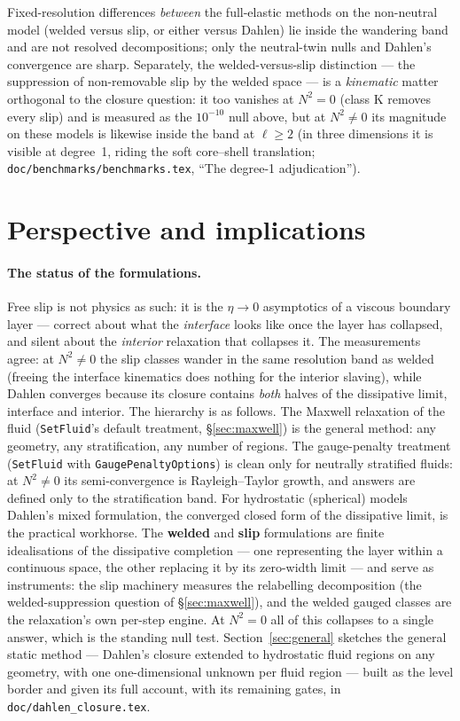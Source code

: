 \documentclass[11pt]{article}
\newcommand{\code}[1]{\texttt{#1}}
\begin{document}
\noindent
Fixed-resolution differences \emph{between} the full-elastic methods
on the non-neutral model (welded versus slip, or either versus
Dahlen) lie inside the wandering band and are not resolved
decompositions; only the neutral-twin nulls and Dahlen's convergence
are sharp. Separately, the welded-versus-slip distinction --- the
suppression of non-removable slip by the welded space --- is a
\emph{kinematic} matter orthogonal to the closure question: it too
vanishes at $N^2 = 0$ (class K removes every slip) and is measured as
the $10^{-10}$ null above, but at $N^2 \neq 0$ its magnitude on these
models is likewise inside the band at $\ell \ge 2$ (in three
dimensions it is visible at degree~1, riding the soft core--shell
translation; \code{doc/benchmarks/benchmarks.tex}, ``The degree-1
adjudication'').

\section{Perspective and implications}
\label{sec:persp}

\paragraph{The status of the formulations.} Free slip is not physics
as such: it is the $\eta \to 0$ asymptotics of a viscous boundary
layer --- correct about what the \emph{interface} looks like once
the layer has collapsed, and silent about the \emph{interior}
relaxation that collapses it. The measurements agree: at
$N^2 \ne 0$ the slip classes wander in the same resolution band as
welded (freeing the interface kinematics does nothing for the
interior slaving), while Dahlen converges because its closure
contains \emph{both} halves of the dissipative limit, interface and
interior. The hierarchy is as follows. The Maxwell relaxation of the
fluid (\code{SetFluid}'s default treatment, \S\ref{sec:maxwell}) is
the general method: any geometry, any stratification, any number of
regions. The gauge-penalty treatment (\code{SetFluid} with
\code{GaugePenaltyOptions}) is clean only for neutrally stratified
fluids: at $N^2 \neq 0$ its semi-convergence is Rayleigh--Taylor
growth, and answers are defined only to the stratification band. For
hydrostatic (spherical) models Dahlen's mixed formulation, the
converged closed form of the dissipative limit, is the practical
workhorse. The \textbf{welded} and \textbf{slip} formulations are
finite idealisations of the dissipative completion --- one
representing the layer within a continuous space, the other
replacing it by its zero-width limit --- and serve as instruments:
the slip machinery measures the relabelling decomposition (the
welded-suppression question of \S\ref{sec:maxwell}), and the
welded gauged classes are the relaxation's own per-step engine.
At $N^2 = 0$ all of this collapses to a single answer, which is the
standing null test. Section~\ref{sec:general} sketches the general
static method --- Dahlen's closure extended to hydrostatic fluid regions
on any geometry, with one one-dimensional unknown per fluid region ---
built as the level border and given its full account, with its
remaining gates, in \code{doc/dahlen\_closure.tex}.
\end{document}
